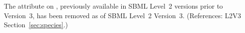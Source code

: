 The  attribute on \Species, previously available in
SBML Level~2 versions prior to Version~3, has been removed as of SBML
Level~2 Version~3.  (References: L2V3 Section~\ref{sec:species}.)
